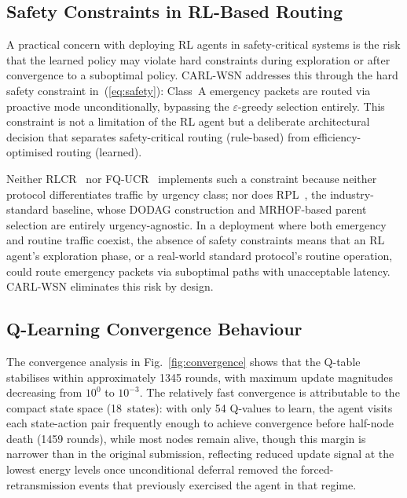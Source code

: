 \documentclass[12pt]{article}
\begin{document}
\subsection{Safety Constraints in RL-Based Routing}

A practical concern with deploying RL agents in safety-critical
systems is the risk that the learned policy may violate hard
constraints during exploration or after convergence to a suboptimal
policy. CARL-WSN addresses this through the hard safety constraint
in~(\ref{eq:safety}): Class~A emergency packets are routed via
proactive mode unconditionally, bypassing the $\varepsilon$-greedy
selection entirely. This constraint is not a limitation of the RL
agent but a deliberate architectural decision that separates
safety-critical routing (rule-based) from efficiency-optimised
routing (learned).

Neither RLCR~\cite{daanoune_intelligent_2026} nor
FQ-UCR~\cite{wang_fqucr_2025} implements such a constraint because
neither protocol differentiates traffic by urgency class; nor does
RPL~\cite{winter2012}, the industry-standard baseline, whose DODAG
construction and MRHOF-based parent selection are entirely
urgency-agnostic. In a deployment where both emergency and routine
traffic coexist, the absence of safety constraints means that an RL
agent's exploration phase, or a real-world standard protocol's
routine operation, could route emergency packets via suboptimal
paths with unacceptable latency. CARL-WSN eliminates this risk by
design.

\subsection{Q-Learning Convergence Behaviour}

The convergence analysis in Fig.~\ref{fig:convergence} shows that
the Q-table stabilises within approximately 1345 rounds, with
maximum update magnitudes decreasing from $10^0$ to $10^{-3}$. The
relatively fast convergence is attributable to the compact state
space (18~states): with only 54 Q-values to learn, the agent
visits each state-action pair frequently enough to achieve
convergence before half-node death (1459 rounds), while most nodes
remain alive, though this margin is narrower than in the original
submission, reflecting reduced update signal at the lowest energy
levels once unconditional deferral removed the forced-retransmission
events that previously exercised the agent in that regime.
\end{document}
